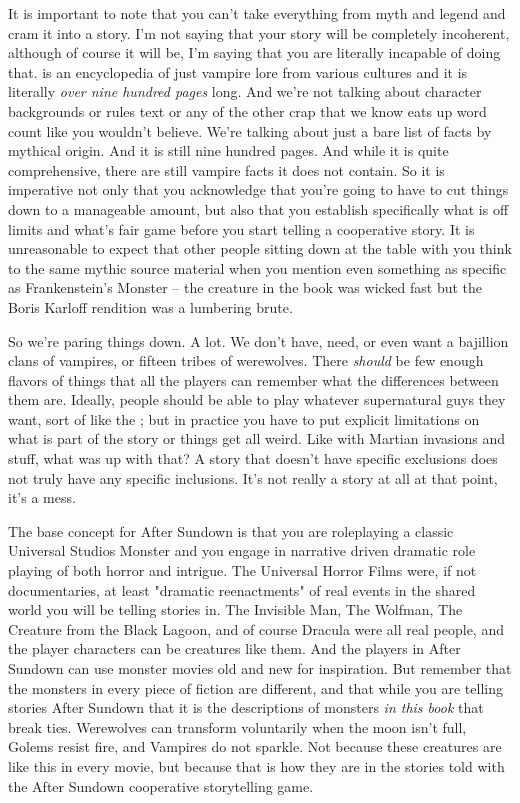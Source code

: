 It is important to note that you can't take everything from myth and legend and cram it into a story. I'm not saying that your story will be completely incoherent, although of course it will be, I'm saying that you are literally incapable of doing that.  is an encyclopedia of just vampire lore from various cultures and it is literally \textit{over nine hundred pages} long. And we're not talking about character backgrounds or rules text or any of the other crap that we know eats up word count like you wouldn't believe. We're talking about just a bare list of facts by mythical origin. And it is still nine hundred pages. And while it is quite comprehensive, there are still vampire facts it does not contain. So it is imperative not only that you acknowledge that you're going to have to cut things down to a manageable amount, but also that you establish specifically what is off limits and what's fair game before you start telling a cooperative story. It is unreasonable to expect that other people sitting down at the table with you think to the same mythic source material when you mention even something as specific as Frankenstein's Monster -- the creature in the book was wicked fast but the Boris Karloff rendition was a lumbering brute.

So we're paring things down. A lot. We don't have, need, or even want a bajillion clans of vampires, or fifteen tribes of werewolves. There \textit{should} be few enough  flavors of things that all the players can remember what the differences between them are. Ideally, people should be able to play whatever supernatural guys they want, sort of like the ; but in practice you have to put explicit limitations on what is part of the story or things get all weird. Like with Martian invasions and stuff, what was up with that? A story that doesn't have specific exclusions does not truly have any specific inclusions. It's not really a story at all at that point, it's a mess.

The base concept for After Sundown is that you are roleplaying a classic Universal Studios Monster and you engage in narrative driven dramatic role playing of both horror and intrigue. The Universal Horror Films were, if not documentaries, at least "dramatic reenactments" of real events in the shared world you will be telling stories in. The Invisible Man, The Wolfman, The Creature from the Black Lagoon, and of course Dracula were all real people, and the player characters can be creatures like them. And the players in After Sundown can use monster movies old and new for inspiration. But remember that the monsters in every piece of fiction are different, and that while you are telling stories After Sundown that it is the descriptions of monsters \textit{in this book} that break ties. Werewolves can transform voluntarily when the moon isn't full, Golems resist fire, and Vampires do not sparkle. Not because these creatures are like this in every movie, but because that is how they are in the stories told with the After Sundown cooperative storytelling game.

